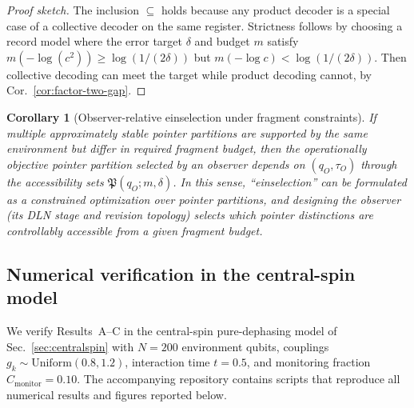 \documentclass[11pt]{article}
\newcommand{\1}{\mathbf{1}}
\theoremstyle{definition}
\theoremstyle{plain}
\newtheorem{corollary}{Corollary}
\begin{document}
\begin{proof}[Proof sketch]
The inclusion $\subseteq$ holds because any product decoder is a special case of a collective decoder on the same register.
Strictness follows by choosing a record model where the error target $\delta$ and budget $m$ satisfy
$m(-\log(c^2))\ge \log(1/(2\delta))$ but $m(-\log c)<\log(1/(2\delta))$.
Then collective decoding can meet the target while product decoding cannot, by Cor.~\ref{cor:factor-two-gap}.
\end{proof}

\begin{corollary}[Observer-relative einselection under fragment constraints]
\label{cor:observer-relative-einselection}
If multiple approximately stable pointer partitions are supported by the same environment but differ in required fragment budget, then the \emph{operationally objective} pointer partition selected by an observer depends on $(q_O,\tau_O)$ through the accessibility sets $\mathfrak{P}(q_O;m,\delta)$.
In this sense, ``einselection'' can be formulated as a constrained optimization over pointer partitions, and designing the observer (its DLN stage and revision topology) selects which pointer distinctions are controllably accessible from a given fragment budget.
\end{corollary}


\subsection{Numerical verification in the central-spin model}
\label{sec:numerical-verification}

We verify Results~A--C in the central-spin pure-dephasing model of Sec.~\ref{sec:centralspin} with $N=200$ environment qubits, couplings $g_k\sim\mathrm{Uniform}(0.8,1.2)$, interaction time $t=0.5$, and monitoring fraction $C_{\mathrm{monitor}}=0.10$.  The accompanying repository contains scripts that reproduce all numerical results and figures reported below.
\end{document}
